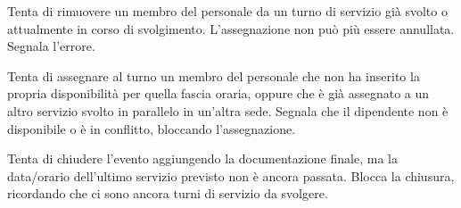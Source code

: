\uctablebegin
    {Tenta di rimuovere un membro del personale da un turno di servizio
     già svolto o attualmente in corso di svolgimento.}
    {L'assegnazione non può più essere annullata. Segnala l'errore.}
\uctableend


\uctablebegin
    {Tenta di assegnare al turno un membro del personale che non ha
     inserito la propria disponibilità per quella fascia oraria, oppure
     che è già assegnato a un altro servizio svolto in parallelo in
     un'altra sede.}
    {Segnala che il dipendente non è disponibile o è in conflitto,
     bloccando l'assegnazione.}
\uctableend


\uctablebegin
    {Tenta di chiudere l'evento aggiungendo la documentazione finale,
     ma la data/orario dell'ultimo servizio previsto non è ancora
     passata.}
    {Blocca la chiusura, ricordando che ci sono ancora turni di
     servizio da svolgere.}
\uctableend
